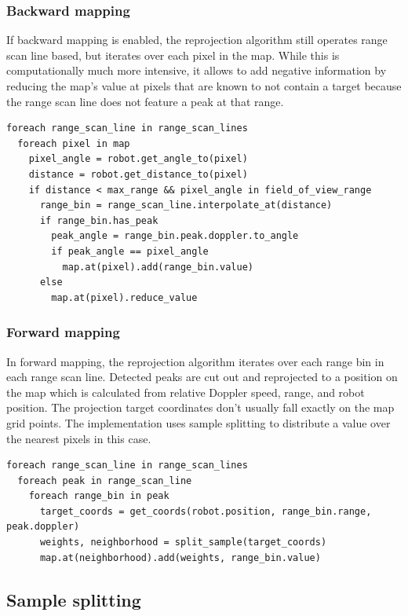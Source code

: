 \subsubsection{Backward mapping}\label{backward-mapping}

If backward mapping is enabled, the reprojection algorithm still
operates range scan line based, but iterates over each pixel in the map.
While this is computationally much more intensive, it allows to add
negative information by reducing the map's value at pixels that are
known to not contain a target because the range scan line does not
feature a peak at that range.

\begin{verbatim}
foreach range_scan_line in range_scan_lines
  foreach pixel in map
    pixel_angle = robot.get_angle_to(pixel)
    distance = robot.get_distance_to(pixel)
    if distance < max_range && pixel_angle in field_of_view_range
      range_bin = range_scan_line.interpolate_at(distance)
      if range_bin.has_peak
        peak_angle = range_bin.peak.doppler.to_angle
        if peak_angle == pixel_angle
          map.at(pixel).add(range_bin.value)
      else
        map.at(pixel).reduce_value
\end{verbatim}

\subsubsection{Forward mapping}\label{forward-mapping}

In forward mapping, the reprojection algorithm iterates over each range
bin in each range scan line. Detected peaks are cut out and reprojected
to a position on the map which is calculated from relative Doppler
speed, range, and robot position. The projection target coordinates
don't usually fall exactly on the map grid points. The implementation
uses sample splitting to distribute a value over the nearest pixels in
this case.

\begin{verbatim}
foreach range_scan_line in range_scan_lines
  foreach peak in range_scan_line
    foreach range_bin in peak
      target_coords = get_coords(robot.position, range_bin.range, peak.doppler)
      weights, neighborhood = split_sample(target_coords)
      map.at(neighborhood).add(weights, range_bin.value)
\end{verbatim}

\subsection{Sample splitting}\label{sample-splitting}

